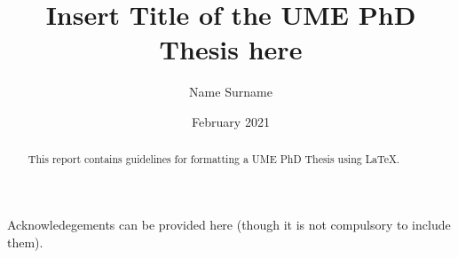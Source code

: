 \documentclass{Miscellaneous/IUSS_Thesis}
\begin{document}
\title{Insert Title of the UME PhD Thesis here} %
\author{Name Surname} %
\date{February 2021}  %
\pagestyle{empty} %
\advisor{} %
\maketitle %
\cleardoublepage %
\maketitle %
\cleardoublepage %

\begin{abstract} %
This report contains guidelines for formatting a UME PhD Thesis using \LaTeX.
\end{abstract} %

\begin{acknowledgements} %
Acknowledegements can be provided here (though it is not compulsory to include them). 
\end{acknowledgements} %

\makeToC %
\makeLoF %
\makeLoT %
\makeLoS %
\cleardoublepage %
\pagestyle{fancy} %



\end{document}
